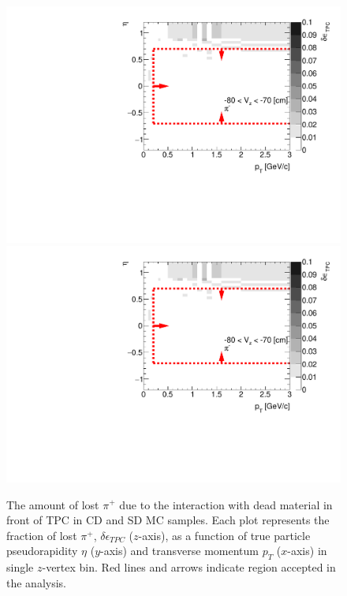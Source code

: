 \begin{figure}[H]
	\caption[The amount of lost $\pi^+$ due to the interaction with dead material in front of TPC as a function of $p_T$, $\eta$ and $z$-vertex in CD and SD]{The amount of lost $\pi^+$ due to the interaction with dead material in front of TPC in CD and SD MC samples. Each plot represents the fraction of lost $\pi^+$, $\delta\epsilon_{ TPC}$ ($z$-axis), as a function of true particle pseudorapidity $\eta$ ($y$-axis) and transverse momentum $p_{T}$ ($x$-axis) in single $z$-vertex bin. Red lines and arrows indicate region accepted in the analysis.}\label{fig:dead_materialSDCD3Dpip}
	\centering
	\parbox{0.325\textwidth}{
		\centering
		\includegraphics[width=\linewidth,page=49]{graphics/systematicsEfficiency/deadMaterial/secondaries_Unbinned_SDCD_.pdf}\\
		\includegraphics[width=\linewidth,page=52]{graphics/systematicsEfficiency/deadMaterial/secondaries_Unbinned_SDCD_.pdf}\\
}
\end{figure}
